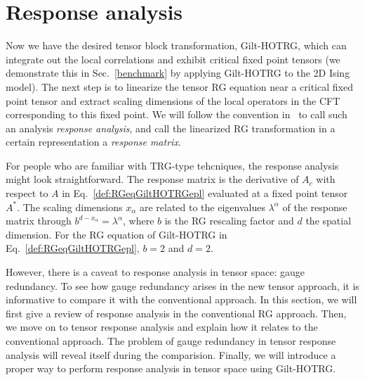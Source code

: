 \documentclass[aps,prb,reprint,superscriptaddress]{revtex4-2}
\begin{document}
\section{Response analysis\label{diffRGeq}}
Now we have the desired tensor block transformation, Gilt-HOTRG, which
can integrate out the local correlations and exhibit critical fixed
point tensors (we demonstrate this in Sec.~\ref{benchmark} by applying
Gilt-HOTRG to the 2D Ising model). The next step is to linearize the
tensor RG equation near a critical fixed point tensor and extract
scaling dimensions of the local operators in the CFT corresponding to
this fixed point. We will follow the convention in~\cite{kadanoff2014}
to call such an analysis \textit{response analysis}, and call the
linearized RG transformation in a certain representation
a \textit{response matrix}.
%

For people who are familiar with TRG-type tehcniques, the response
analysis might look straightforward. The response matrix is the
derivative of $A_c$ with respect to $A$ in
Eq.~\eqref{def:RGeqGiltHOTRGepl} evaluated at a fixed point tensor
$A^{*}$. The scaling dimensions $x_{\alpha}$ are related to the eigenvalues
$\lambda^{\alpha}$ of the response matrix through $b^{d-x_{\alpha}} =
\lambda^{\alpha}$, where $b$ is the RG rescaling factor and $d$ the
spatial dimension. For the RG equation of Gilt-HOTRG in
Eq.~\eqref{def:RGeqGiltHOTRGepl}, $b = 2$ and $d = 2$. 
%

However, there is a caveat to response analysis in tensor space: gauge
redundancy. To see how gauge redundancy arises in the new tensor
approach, it is informative to compare it with the conventional
approach. In this section, we will first give a review of response
analysis in the conventional RG approach. Then, we move on to tensor
response analysis and explain how it relates to the conventional
approach. The problem of gauge redundancy in tensor response analysis will
reveal itself during the comparision. Finally, we will introduce a
proper way to perform response analysis in tensor space using
Gilt-HOTRG.
%
\end{document}
